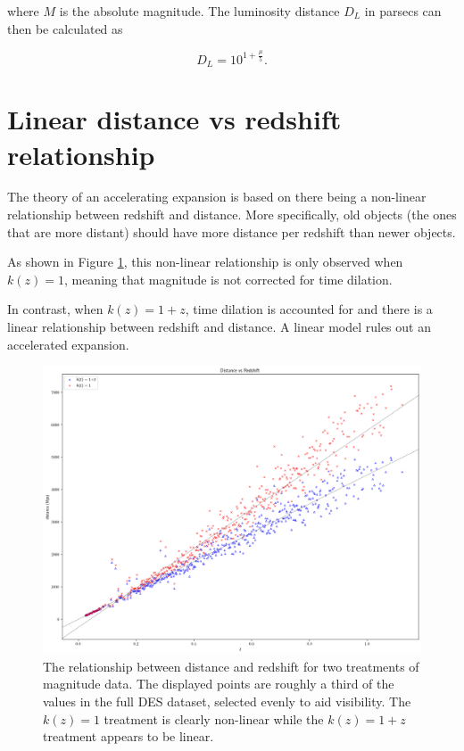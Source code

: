 \documentclass{article}
\begin{document}
where $M$ is the absolute magnitude. The luminosity distance $D_L$ in parsecs
can then be calculated as

\begin{equation}
  D_L = 10^{1 + \frac{\mu}{5}}.
\end{equation}

\section{Linear distance vs redshift relationship}

The theory of an accelerating expansion is based on there being a non-linear
relationship between redshift and distance. More specifically, old objects (the
ones that are more distant) should have more distance per redshift than newer
objects.

As shown in Figure \ref{fig:mu_distance_vs_redshift}, this non-linear
relationship is only observed when $k(z) = 1$, meaning that magnitude is not
corrected for time dilation.

In contrast, when $k(z) = 1 + z$, time dilation is accounted for and there is a
linear relationship between redshift and distance. A linear model rules out an
accelerated expansion.

\begin{figure}[ht]
  \includegraphics[width=\linewidth]{mu_distance_vs_redshift.png}
  \caption{The relationship between distance and redshift for two treatments of
  magnitude data. The displayed points are roughly a third of the values in the
  full DES dataset, selected evenly to aid visibility. The $k(z) = 1$ treatment
  is clearly non-linear while the $k(z) = 1 + z$ treatment appears to be
  linear.}
  \label{fig:mu_distance_vs_redshift}
\end{figure}
\end{document}
